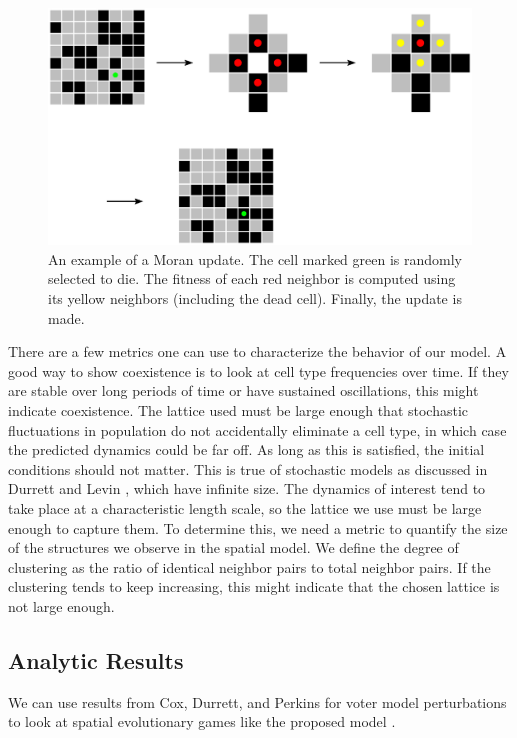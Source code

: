 \documentclass[12pt]{amsart}
\begin{document}
\begin{figure}
\centering
\includegraphics[width = \linewidth]{Diagrams/General/themodel}
\caption{An example of a Moran update. The cell marked green is randomly selected to die. The fitness of each red neighbor is computed using its yellow neighbors (including the dead cell). Finally, the update is made.}
\end{figure}

There are a few metrics one can use to characterize the behavior of our model. A good way to show coexistence is to look at cell type frequencies over time. If they are stable over long periods of time or have sustained oscillations, this might indicate coexistence. The lattice used must be large enough that stochastic fluctuations in population do not accidentally eliminate a cell type, in which case the predicted dynamics could be far off. As long as this is satisfied, the initial conditions should not matter. This is true of stochastic models as discussed in Durrett and Levin \cite{Durrett1994}, which have infinite size. The dynamics of interest tend to take place at a characteristic length scale, so the lattice we use must be large enough to capture them. To determine this, we need a metric to quantify the size of the structures we observe in the spatial model. We define the degree of clustering as the ratio of identical neighbor pairs to total neighbor pairs. If the clustering tends to keep increasing, this might indicate that the chosen lattice is  not large enough.

\subsection{Analytic Results}
We can use results from Cox, Durrett, and Perkins for voter model perturbations to look at spatial evolutionary games like the proposed model \cite{Cox2011}. 
\end{document}
